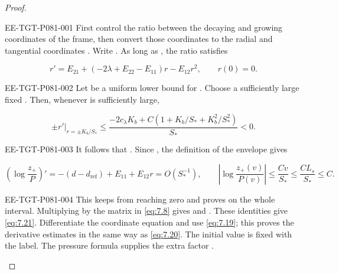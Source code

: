 \begin{proof}
\begin{EESegment}{EE-TGT-P081-001}
First control the ratio between the decaying and growing coordinates of the frame, then convert those coordinates to the radial and tangential coordinates . Write . As long as , the ratio  satisfies
\end{EESegment}
\[
  r'=E_{21}+(-2\lambda+E_{22}-E_{11})r-E_{12}r^2,
  \qquad r(0)=0.
\]
\begin{EESegment}{EE-TGT-P081-002}
Let  be a uniform lower bound for . Choose a sufficiently large fixed . Then, whenever  is sufficiently large,
\end{EESegment}
\[
  \left.\pm r'\right|_{r=\pm K_b/S_*}
  \leq
  \frac{-2c_\lambda K_b+C(1+K_b/S_*+K_b^2/S_*^2)}{S_*}<0.
\]
\begin{EESegment}{EE-TGT-P081-003}
It follows that . Since , the definition of the envelope gives
\end{EESegment}
\[
  \left(\log\frac{z_+}{P}\right)'
  =-(d-d_{\mathrm{ref}})+E_{11}+E_{12}r=O(S_*^{-1}),
  \qquad
  \left|\log\frac{z_+(v)}{P(v)}\right|
  \leq\frac{Cv}{S_*}\leq\frac{CL_s}{S_*}\leq C.
\]
\begin{EESegment}{EE-TGT-P081-004}
This keeps  from reaching zero and proves  on the whole interval. Multiplying by the matrix in \eqref{eq:7.8} gives  and . These identities give \eqref{eq:7.21}. Differentiate the coordinate equation and use \eqref{eq:7.19}; this proves the derivative estimates in the same way as \eqref{eq:7.20}. The initial value  is fixed with the label. The pressure formula supplies the extra factor .
\end{EESegment}
\end{proof}

